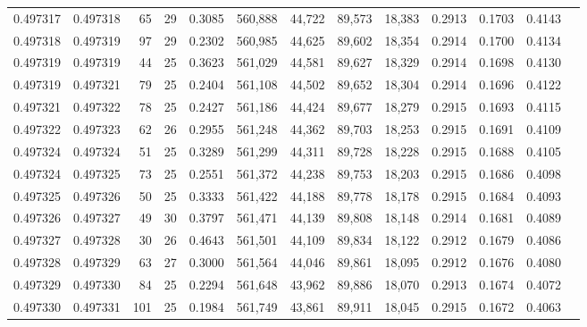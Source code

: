 \begin{tabular}{rrrrrrrrrrrrr}
0.497317 & 0.497318 &  65 &  29 &                                     0.3085 & 560,888 &  44,722 &  89,573 &  18,383 & 0.2913 & 0.1703 & 0.4143 \\
0.497318 & 0.497319 &  97 &  29 &                                     0.2302 & 560,985 &  44,625 &  89,602 &  18,354 & 0.2914 & 0.1700 & 0.4134 \\
0.497319 & 0.497319 &  44 &  25 &                                     0.3623 & 561,029 &  44,581 &  89,627 &  18,329 & 0.2914 & 0.1698 & 0.4130 \\
0.497319 & 0.497321 &  79 &  25 &                                     0.2404 & 561,108 &  44,502 &  89,652 &  18,304 & 0.2914 & 0.1696 & 0.4122 \\
0.497321 & 0.497322 &  78 &  25 &                                     0.2427 & 561,186 &  44,424 &  89,677 &  18,279 & 0.2915 & 0.1693 & 0.4115 \\
0.497322 & 0.497323 &  62 &  26 &                                     0.2955 & 561,248 &  44,362 &  89,703 &  18,253 & 0.2915 & 0.1691 & 0.4109 \\
0.497324 & 0.497324 &  51 &  25 &                                     0.3289 & 561,299 &  44,311 &  89,728 &  18,228 & 0.2915 & 0.1688 & 0.4105 \\
0.497324 & 0.497325 &  73 &  25 &                                     0.2551 & 561,372 &  44,238 &  89,753 &  18,203 & 0.2915 & 0.1686 & 0.4098 \\
0.497325 & 0.497326 &  50 &  25 &                                     0.3333 & 561,422 &  44,188 &  89,778 &  18,178 & 0.2915 & 0.1684 & 0.4093 \\
0.497326 & 0.497327 &  49 &  30 &                                     0.3797 & 561,471 &  44,139 &  89,808 &  18,148 & 0.2914 & 0.1681 & 0.4089 \\
0.497327 & 0.497328 &  30 &  26 &                                     0.4643 & 561,501 &  44,109 &  89,834 &  18,122 & 0.2912 & 0.1679 & 0.4086 \\
0.497328 & 0.497329 &  63 &  27 &                                     0.3000 & 561,564 &  44,046 &  89,861 &  18,095 & 0.2912 & 0.1676 & 0.4080 \\
0.497329 & 0.497330 &  84 &  25 &                                     0.2294 & 561,648 &  43,962 &  89,886 &  18,070 & 0.2913 & 0.1674 & 0.4072 \\
0.497330 & 0.497331 & 101 &  25 &                                     0.1984 & 561,749 &  43,861 &  89,911 &  18,045 & 0.2915 & 0.1672 & 0.4063 \\

\end{tabular}
